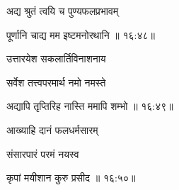 \nemslokac

{\devanagarifont अद्य श्रुतं त्वयि च पुण्यफलप्रभावम् }%
  \dontdisplaylinenum    {}%



\nemslokad

{\devanagarifont पूर्णानि चाद्य मम इष्टमनोरथानि {॥ १६:४८॥} \veg\dontdisplaylinenum }%

\ujvers{}    %


\nemslokab

{\devanagarifont उत्तारयेश सकलार्तिविनाशनाय  \danda\dontdisplaylinenum }%

\nemslokac

{\devanagarifont सर्वेश तत्त्वपरमार्थ नमो नमस्ते }%
  \dontdisplaylinenum


\nemslokad

{\devanagarifont अद्यापि तृप्तिरिह नास्ति ममापि शम्भो {॥ १६:४९॥} \veg\dontdisplaylinenum }%

\ujvers{}    %


\nemslokab

{\devanagarifont आख्याहि दानं फलधर्मसारम्  \danda\dontdisplaylinenum }%
 
\nemslokac

{\devanagarifont संसारपारं परमं नयस्व }%
  \dontdisplaylinenum    {}%



\nemslokad

{\devanagarifont कृपां मयीशान कुरु प्रसीद {॥ १६:५०॥} \veg\dontdisplaylinenum }%

